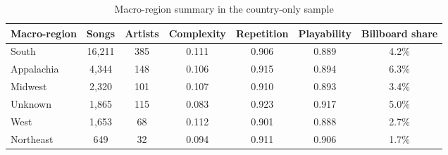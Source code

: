 \begin{table}[H]
\centering
\caption{Macro-region summary in the country-only sample}
\label{tab:geo}
\begin{tabular}{lcccccc}
\toprule
Macro-region & Songs & Artists & Complexity & Repetition & Playability & Billboard share \\
\midrule
South & 16,211 & 385 & 0.111 & 0.906 & 0.889 & 4.2\% \\
Appalachia & 4,344 & 148 & 0.106 & 0.915 & 0.894 & 6.3\% \\
Midwest & 2,320 & 101 & 0.107 & 0.910 & 0.893 & 3.4\% \\
Unknown & 1,865 & 115 & 0.083 & 0.923 & 0.917 & 5.0\% \\
West & 1,653 & 68 & 0.112 & 0.901 & 0.888 & 2.7\% \\
Northeast & 649 & 32 & 0.094 & 0.911 & 0.906 & 1.7\% \\
\bottomrule
\end{tabular}
\end{table}
